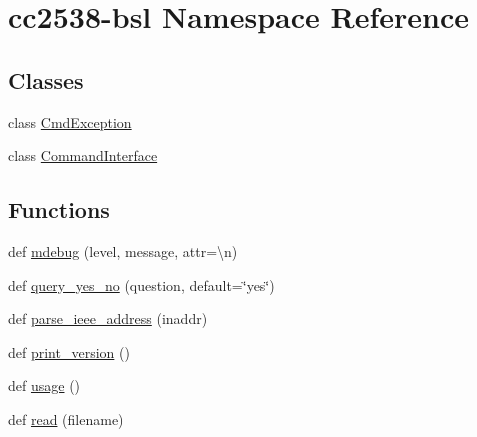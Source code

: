 \hypertarget{namespacecc2538-bsl}{}\section{cc2538-\/bsl Namespace Reference}
\label{namespacecc2538-bsl}
\subsection*{Classes}
\begin{DoxyCompactItemize}
\item 
class \hyperlink{classcc2538-bsl_1_1_cmd_exception}{Cmd\+Exception}
\item 
class \hyperlink{classcc2538-bsl_1_1_command_interface}{Command\+Interface}
\end{DoxyCompactItemize}
\subsection*{Functions}
\begin{DoxyCompactItemize}
\item 
def \hyperlink{namespacecc2538-bsl_aafdb3727bf1279bc721ec38c4d5205a5}{mdebug} (level, message, attr=\textquotesingle{}\textbackslash{}n\textquotesingle{})
\item 
def \hyperlink{namespacecc2538-bsl_ad1206c0683b83afa74c346bd1fc0ee17}{query\+\_\+yes\+\_\+no} (question, default=\char`\"{}yes\char`\"{})
\item 
def \hyperlink{namespacecc2538-bsl_ac6c8e3135ca098d1be447e4ba3973159}{parse\+\_\+ieee\+\_\+address} (inaddr)
\item 
def \hyperlink{namespacecc2538-bsl_aa00f797eaa91b7295ea2e0a3d28eac1a}{print\+\_\+version} ()
\item 
def \hyperlink{namespacecc2538-bsl_a80cfb11741ed775fdfe90f4fba8955f9}{usage} ()
\item 
def \hyperlink{namespacecc2538-bsl_a1c6dc3d541387c959e9d61d8a88863fd}{read} (filename)
\end{DoxyCompactItemize}
